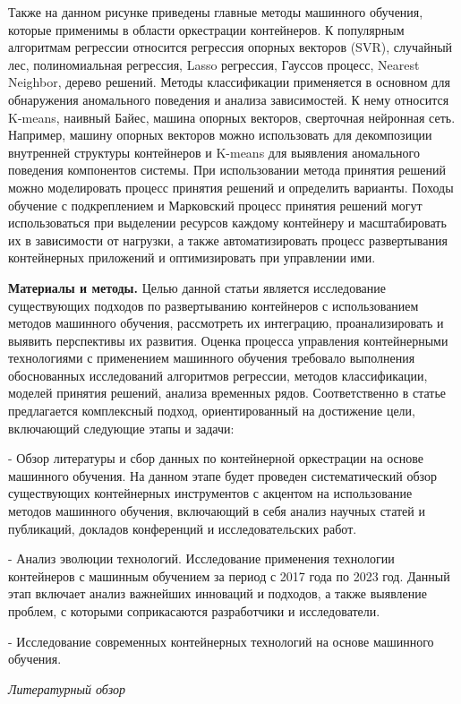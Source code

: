 Также на данном рисунке приведены главные методы машинного обучения,
которые применимы в области оркестрации контейнеров. К популярным
алгоритмам регрессии относится регрессия опорных векторов (SVR),
случайный лес, полиномиальная регрессия, Lasso регрессия, Гауссов
процесс, Nearest Neighbor, дерево решений. Методы классификации
применяется в основном для обнаружения аномального поведения и анализа
зависимостей. К нему относится K-means, наивный Байес, машина опорных
векторов, сверточная нейронная сеть. Например, машину опорных векторов
можно использовать для декомпозиции внутренней структуры контейнеров и
K-means для выявления аномального поведения компонентов системы. При
использовании метода принятия решений можно моделировать процесс
принятия решений и определить варианты. Походы обучение с подкреплением
и Марковский процесс принятия решений могут использоваться при выделении
ресурсов каждому контейнеру и масштабировать их в зависимости от
нагрузки, а также автоматизировать процесс развертывания контейнерных
приложений и оптимизировать при управлении ими.

{\bfseries Материалы и методы.} Целью данной статьи является исследование
существующих подходов по развертыванию контейнеров с использованием
методов машинного обучения, рассмотреть их интеграцию, проанализировать
и выявить перспективы их развития. Оценка процесса управления
контейнерными технологиями с применением машинного обучения требовало
выполнения обоснованных исследований алгоритмов регрессии, методов
классификации, моделей принятия решений, анализа временных рядов.
Соответственно в статье предлагается комплексный подход, ориентированный
на достижение цели, включающий следующие этапы и задачи:

- Обзор литературы и сбор данных по контейнерной оркестрации на основе
машинного обучения. На данном этапе будет проведен систематический обзор
существующих контейнерных инструментов с акцентом на использование
методов машинного обучения, включающий в себя анализ научных статей и
публикаций, докладов конференций и исследовательских работ.

- Анализ эволюции технологий. Исследование применения технологии
контейнеров с машинным обучением за период с 2017 года по 2023 год.
Данный этап включает анализ важнейших инноваций и подходов, а также
выявление проблем, с которыми соприкасаются разработчики и
исследователи.

- Исследование современных контейнерных технологий на основе машинного
обучения.

\emph{Литературный обзор}

